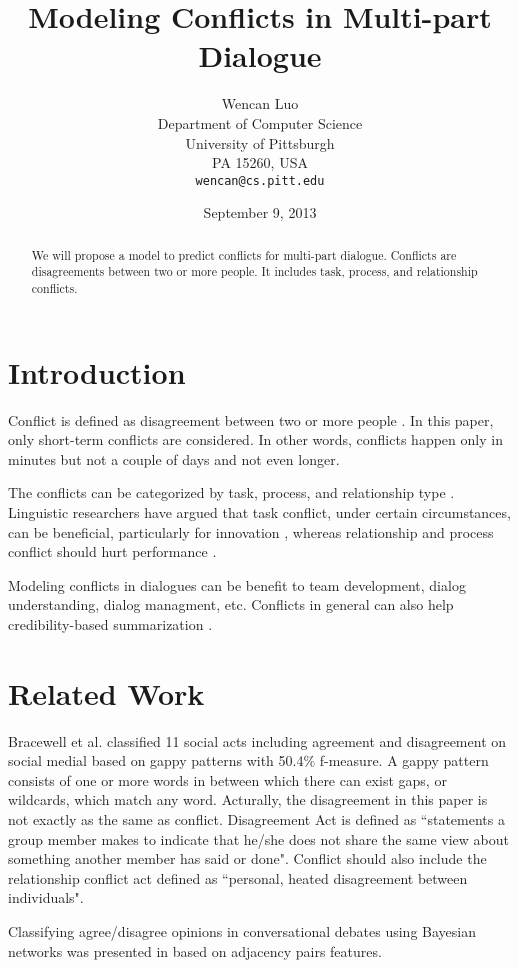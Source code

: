 \documentclass[11pt,letterpaper]{article}
\title{Modeling Conflicts in Multi-part Dialogue}
\author{Wencan Luo\\
	    Department of Computer Science\\
	    University of Pittsburgh\\
	    PA 15260, USA\\
	    {\tt wencan@cs.pitt.edu}
	  }
\date{September 9, 2013}
\begin{document}
\maketitle
\begin{abstract}
We will propose a model to predict conflicts for multi-part dialogue. Conflicts are disagreements between two or more people. It includes task, process, and relationship conflicts.

\end{abstract}

\section{Introduction}
Conflict is defined as disagreement between two or more people \cite{Paletz:2011}. In this paper, only short-term conflicts are considered. In other words, conflicts happen only in minutes but not a couple of days and not even longer.

The conflicts can be categorized by task, process, and relationship type \cite{Jehn:1995,Jehn:1997}. Linguistic researchers have argued that task conflict, under certain circumstances, can be beneficial, particularly for innovation \cite{Jehn:1997,West:2002}, whereas relationship and process conflict should hurt performance \cite{Jehn:1997}.

Modeling conflicts in dialogues can be benefit to team development, dialog understanding, dialog managment, etc. Conflicts in general can also help credibility-based summarization \cite{Kaneko:2009}.

\section{Related Work}
Bracewell et al.  classified 11 social acts including agreement and disagreement on social medial based on gappy patterns with 50.4\% f-measure. A gappy pattern consists of one or more words in between which there can exist gaps, or wildcards, which match any word. Acturally, the disagreement in this paper is not exactly as the same as conflict. Disagreement Act is defined as ``statements a group member makes to indicate that he/she does not share the same
view about something another member has said or done". Conflict should also include the relationship conflict act defined as ``personal, heated disagreement between individuals".

Classifying agree/disagree opinions in conversational debates using Bayesian networks was presented in \cite{Galley:2004} based on adjacency pairs features.
\end{document}
